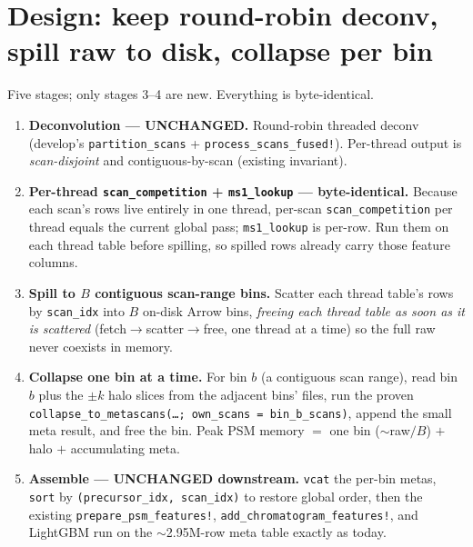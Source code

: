 \documentclass[11pt]{article}
\newcommand{\code}[1]{\texttt{\small #1}}
\begin{document}
\section{Design: keep round-robin deconv, spill raw to disk, collapse per bin}
Five stages; only stages 3--4 are new. Everything is byte-identical.

\begin{enumerate}[nosep]
  \item \textbf{Deconvolution --- UNCHANGED.} Round-robin threaded deconv (develop's
    \code{partition\_scans} + \code{process\_scans\_fused!}). Per-thread output is
    \emph{scan-disjoint} and contiguous-by-scan (existing invariant).
  \item \textbf{Per-thread \code{scan\_competition} + \code{ms1\_lookup} --- byte-identical.}
    Because each scan's rows live entirely in one thread, per-scan \code{scan\_competition}
    per thread equals the current global pass; \code{ms1\_lookup} is per-row. Run them on each
    thread table before spilling, so spilled rows already carry those feature columns.
  \item \textbf{Spill to \(B\) contiguous scan-range bins.} Scatter each thread table's rows
    by \code{scan\_idx} into \(B\) on-disk Arrow bins, \emph{freeing each thread table as soon
    as it is scattered} (fetch\(\to\)scatter\(\to\)free, one thread at a time) so the full raw
    never coexists in memory.
  \item \textbf{Collapse one bin at a time.} For bin \(b\) (a contiguous scan range), read bin
    \(b\) plus the \(\pm k\) halo slices from the adjacent bins' files, run the proven
    \code{collapse\_to\_metascans(\dots; own\_scans = bin\_b\_scans)}, append the small meta
    result, and free the bin. Peak PSM memory \(=\) one bin (\(\sim\)raw\(/B\)) \(+\) halo \(+\)
    accumulating meta.
  \item \textbf{Assemble --- UNCHANGED downstream.} \code{vcat} the per-bin metas, \code{sort}
    by \code{(precursor\_idx, scan\_idx)} to restore global order, then the existing
    \code{prepare\_psm\_features!}, \code{add\_chromatogram\_features!}, and LightGBM run on the
    \(\sim\)2.95M-row meta table exactly as today.
\end{enumerate}
\end{document}
